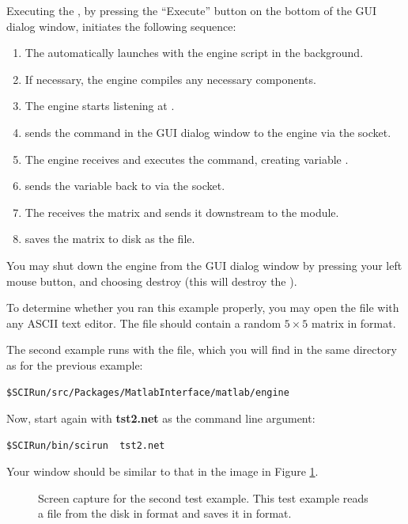 Executing the \mlm{}, by pressing the ``Execute'' button on the bottom of
the GUI dialog window, initiates the following sequence:
%
\begin{enumerate}
  \item The \mlm{} automatically launches \m{} with the engine script in
        the background. 
  \item If necessary, the engine compiles any necessary components.
  \item The engine starts listening at .
  \item \mlm{} sends the command in the GUI dialog window to the engine
        via the socket.
  \item The engine receives and executes the command, creating
        variable .
  \item \m{} sends the variable
         back to \sr{} via the socket.
  \item The  \mlm{} receives the matrix and sends it downstream to
        the  module. 
  \item {} saves the matrix to disk as the
         file. 
\end{enumerate}

You may shut down the \m{} engine from the \mlm{} GUI dialog window by
pressing your left mouse button, and choosing destroy (this will destroy
the \mlm{}).

To determine whether you ran this example properly, you may open the file
 with any ASCII text editor. The file should contain a
random $5 \times 5$ matrix in \sr{} format.


The second example runs with the  file, which you will
find in the same directory as for the previous example:
%
\begin{verbatim}
$SCIRun/src/Packages/MatlabInterface/matlab/engine
\end{verbatim}

Now, start \sr{} again with {\bf tst2.net} as the command line
argument: 
%
\begin{verbatim}
$SCIRun/bin/scirun  tst2.net
\end{verbatim}
%
Your window should be similar to that in the image in Figure
\ref{fig:tst2}.

\begin{figure}[htb]
  \begin{makeimage}
  \end{makeimage}
  \tsttwo
  \caption{\label{fig:tst2} Screen capture for the second test
  example. This test example reads a
  file from the disk in \sr{} format and saves it in \m{} format.}
\end{figure}


